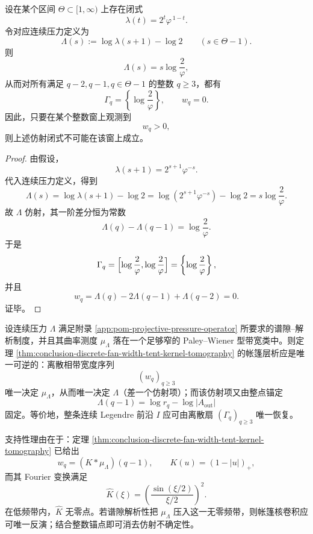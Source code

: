\begin{theorem}[仿射闭式的扇宽排斥]\label{thm:conclusion-affine-closed-form-excluded-by-fan-width}
设在某个区间 \(\Theta\subset[1,\infty)\) 上存在闭式
\[
\lambda(t)=2^t\varphi^{\,1-t}.
\]
令对应连续压力定义为
\[
\Lambda(s):=\log\lambda(s+1)-\log 2
\qquad (s\in\Theta-1).
\]
则
\[
\Lambda(s)=s\log\frac{2}{\varphi},
\]
从而对所有满足 \(q-2,q-1,q\in\Theta-1\) 的整数 \(q\ge 3\)，都有
\[
\Gamma_q=
\left\{\log\frac{2}{\varphi}\right\},
\qquad
w_q=0.
\]
因此，只要在某个整数窗上观测到
\[
w_q>0,
\]
则上述仿射闭式不可能在该窗上成立。
\end{theorem}
\begin{proof}
由假设，
\[
\lambda(s+1)=2^{s+1}\varphi^{-s}.
\]
代入连续压力定义，得到
\[
\Lambda(s)
=
\log\lambda(s+1)-\log 2
=
\log(2^{s+1}\varphi^{-s})-\log 2
=
s\log\frac{2}{\varphi}.
\]
故 \(\Lambda\) 仿射，其一阶差分恒为常数
\[
\Lambda(q)-\Lambda(q-1)=\log\frac{2}{\varphi}.
\]
于是
\[
\Gamma_q=
\Bigl[
\log\frac{2}{\varphi},
\log\frac{2}{\varphi}
\Bigr]
=
\left\{\log\frac{2}{\varphi}\right\},
\]
并且
\[
w_q=\Lambda(q)-2\Lambda(q-1)+\Lambda(q-2)=0.
\]
证毕。
\end{proof}



\begin{conjecture}[帐篷核层析的唯一重建]\label{conj:conclusion-tent-kernel-tomography-unique-reconstruction}
设连续压力 \(\Lambda\) 满足附录 \ref{app:pom-projective-pressure-operator} 所要求的谱隙--解析制度，并且其曲率测度 \(\mu_\Lambda\) 落在一个足够窄的 Paley--Wiener 型带宽类中。则定理 \ref{thm:conclusion-discrete-fan-width-tent-kernel-tomography} 的帐篷层析应是唯一可逆的：离散相带宽度序列
\[
(w_q)_{q\ge 3}
\]
唯一决定 \(\mu_\Lambda\)，从而唯一决定 \(\Lambda\)（差一个仿射项）；而该仿射项又由整点锚定
\[
\Lambda(q-1)=\log r_q-\log|A_{\mathrm{out}}|
\]
固定。等价地，整条连续 Legendre 前沿 \(I\) 应可由离散扇 \((\Gamma_q)_{q\ge 3}\) 唯一恢复。

支持性理由在于：定理 \ref{thm:conclusion-discrete-fan-width-tent-kernel-tomography} 已给出
\[
w_q=(K\ast\mu_\Lambda)(q-1),
\qquad
K(u)=(1-|u|)_+,
\]
而其 Fourier 变换满足
\[
\widehat K(\xi)=\left(\frac{\sin(\xi/2)}{\xi/2}\right)^2.
\]
在低频带内，\(\widehat K\) 无零点。若谱隙解析性把 \(\mu_\Lambda\) 压入这一无零频带，则帐篷核卷积应可唯一反演；结合整数锚点即可消去仿射不确定性。
\end{conjecture}
